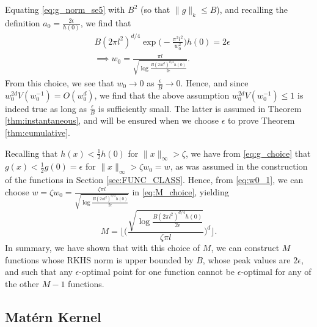\documentclass[english,onecolumn,final,11pt]{IEEEtran} %
\begin{document}
Equating \eqref{eq:g_norm_se5} with $B^2$ (so that $\|g\|_k \le B$), and recalling the definition $a_0 = \frac{2\epsilon}{h(0)}$, we find that
\begin{align}
    & B (2\pi l^2)^{d/4} \exp\Big( - \frac{ \pi^2 l^2 }{ w_0^2 } \Big) h(0) = 2\epsilon \\
    &\implies w_0 = \frac{\pi l}{ \sqrt{\log\frac{B (2\pi l^2)^{d/4} h(0)}{2\epsilon} } }. \label{eq:w0_1}
\end{align}
From this choice, we see that $w_0 \to 0$ as $\frac{\epsilon}{B} \to 0$.  Hence, and since $w_0^{2d} V(w_0^{-1}) = O(w_0^d)$, we find that the above assumption $w_0^{2d} V(w_0^{-1}) \le 1$ is indeed true as long as $\frac{\epsilon}{B}$ is sufficiently small.  The latter is assumed in Theorem \ref{thm:instantaneous}, and will be ensured when we choose $\epsilon$ to prove Theorem \ref{thm:cumulative}.

Recalling that $h(x) < \frac{1}{2}h(0)$ for $\|x\|_{\infty} > \zeta$, we have from \eqref{eq:g_choice} that $g(x) < \frac{1}{2}g(0) = \epsilon$ for $\|x\|_{\infty} > \zeta w_0 = w$, as was assumed in the construction of the functions in Section \ref{sec:FUNC_CLASS}.  Hence, from \eqref{eq:w0_1}, we can choose $w = \zeta w_0 = \frac{\zeta \pi l}{ \sqrt{\log\frac{B (2\pi l^2)^{d/4} h(0)}{2\epsilon} } }$ in \eqref{eq:M_choice}, yielding
\begin{equation}
    M = \Bigg\lfloor \Bigg( \frac{ \sqrt{\log\frac{B (2\pi l^2)^{d/4} h(0)}{2\epsilon}} }{\zeta \pi l} \Bigg)^d \Bigg\rfloor. \label{eq:M_se}
\end{equation}
In summary, we have shown that with this choice of $M$, we can construct $M$ functions whose RKHS norm is upper bounded by $B$, whose peak values are $2\epsilon$, and such that any $\epsilon$-optimal point for one function cannot be $\epsilon$-optimal for any of the other $M-1$ functions.

\subsection{Mat\'ern Kernel}
\end{document}
